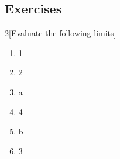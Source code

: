 \documentclass[symmetric,justified,marginals=justified,notoc]{tufte-book}
\begin{document}
\begin{mdframed}[style=exercisestyle]
\lipsum
\end{mdframed}


\pagebreak

\subsection*{Exercises}

\begin{fullwidth}

\begin{multicols}{2}[Evaluate the following limits]
\begin{enumerate}[1)]
\item 1
\item 2
\item a
\item 4
\item b
\item 3
\end{enumerate}
\end{multicols}

\end{fullwidth}
\end{document}
